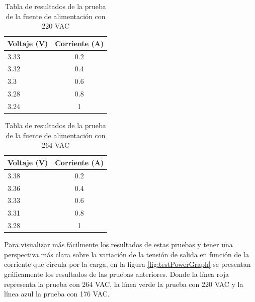\begin{table}[h]
	\centering
	\caption[Prueba de la fuente de alimentación 220 VAC]{Tabla de resultados de la prueba de la fuente de alimentación con 220 VAC}
	\begin{tabular}{l c}    
		\toprule
		\textbf{Voltaje (V)} & \textbf{Corriente (A)} \\
		\midrule
		3.33 & 0.2 \\		
		3.32 & 0.4 \\		
		3.3 & 0.6 \\
		3.28 & 0.8 \\
		3.24 & 1 \\
		\bottomrule
		\hline
	\end{tabular}
	\label{tab:testPower220}
\end{table}

\begin{table}[h]
	\centering
	\caption[Prueba de la fuente de alimentación 264 VAC]{Tabla de resultados de la prueba de la fuente de alimentación con 264 VAC}
	\begin{tabular}{l c}    
		\toprule
		\textbf{Voltaje (V)} & \textbf{Corriente (A)} \\
		\midrule
		3.38 & 0.2 \\		
		3.36 & 0.4 \\		
		3.33 & 0.6 \\
		3.31 & 0.8 \\
		3.28 & 1 \\
		\bottomrule
		\hline
	\end{tabular}
	\label{tab:testPower264}
\end{table}

Para visualizar más fácilmente los resultados de estas pruebas y tener una perspectiva más clara sobre la variación de la tensión de salida en función de la corriente que circula por la carga, en la figura \ref{fig:testPowerGraph} se presentan gráficamente los resultados de las pruebas anteriores. Donde la línea roja representa la prueba con 264 VAC, la línea verde la prueba con 220 VAC y la línea azul la prueba con 176 VAC.

